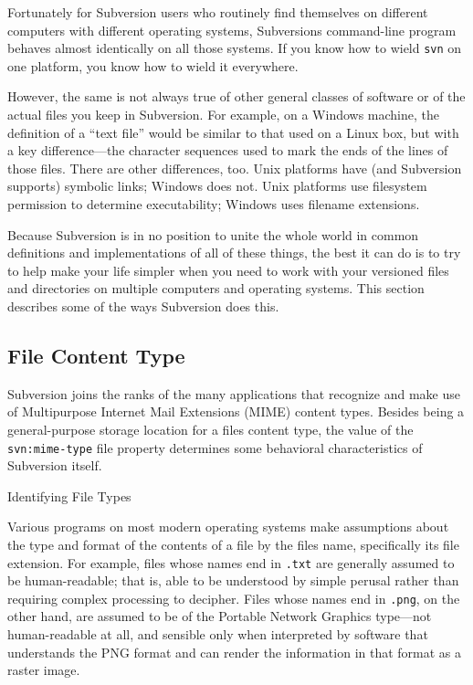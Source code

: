 Fortunately for Subversion users who routinely find themselves on
different computers with different operating systems,
Subversion\textquotesingle s command-line program behaves almost
identically on all those systems. If you know how to wield \texttt{svn}
on one platform, you know how to wield it everywhere.

However, the same is not always true of other general classes of
software or of the actual files you keep in Subversion. For example, on
a Windows machine, the definition of a ``text file'' would be similar to
that used on a Linux box, but with a key difference---the character
sequences used to mark the ends of the lines of those files. There are
other differences, too. Unix platforms have (and Subversion supports)
symbolic links; Windows does not. Unix platforms use filesystem
permission to determine executability; Windows uses filename extensions.

Because Subversion is in no position to unite the whole world in common
definitions and implementations of all of these things, the best it can
do is to try to help make your life simpler when you need to work with
your versioned files and directories on multiple computers and operating
systems. This section describes some of the ways Subversion does this.

\subsection{File Content
Type}\label{svn.advanced.props.special.mime-type}

Subversion joins the ranks of the many applications that recognize and
make use of Multipurpose Internet Mail Extensions (MIME) content types.
Besides being a general-purpose storage location for a
file\textquotesingle s content type, the value of the
\texttt{svn:mime-type} file property determines some behavioral
characteristics of Subversion itself.

Identifying File Types

Various programs on most modern operating systems make assumptions about
the type and format of the contents of a file by the
file\textquotesingle s name, specifically its file extension. For
example, files whose names end in \texttt{.txt} are generally assumed to
be human-readable; that is, able to be understood by simple perusal
rather than requiring complex processing to decipher. Files whose names
end in \texttt{.png}, on the other hand, are assumed to be of the
Portable Network Graphics type---not human-readable at all, and sensible
only when interpreted by software that understands the PNG format and
can render the information in that format as a raster image.

